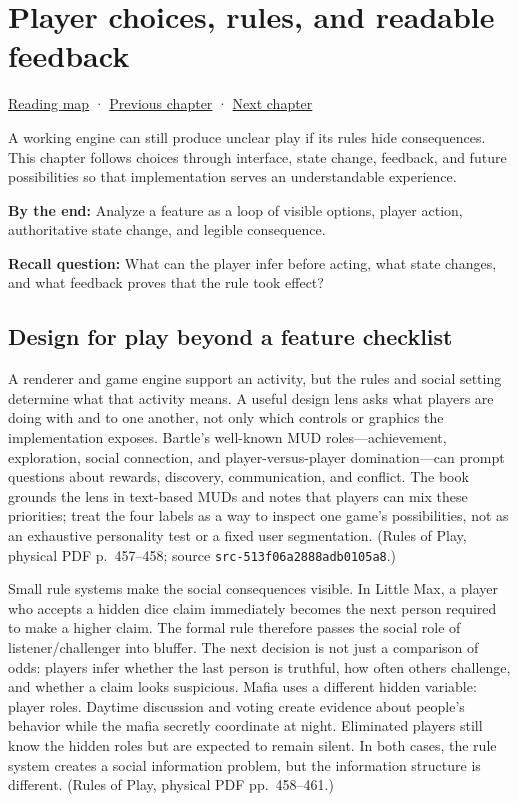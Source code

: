 \hypertarget{05-engine-i-ch009}{}
\chapter{Player choices, rules, and readable feedback}\label{stagechapter:05-engine-i-ch009}\label{05-engine-i-ch009-player-choices-rules-and-readable-feedback}

\hyperref[volume-reading-map]{Reading map} · \hyperref[05-engine-i-ch008-algorithms-application-boundaries-and-a-first-playable]{Previous chapter} · \hyperref[05-engine-i-ch010-engine-changes-across-subsystem-contracts]{Next chapter}

A working engine can still produce unclear play if its rules hide consequences. This chapter follows choices through interface, state change, feedback, and future possibilities so that implementation serves an understandable experience.

\textbf{By the end:} Analyze a feature as a loop of visible options, player action, authoritative state change, and legible consequence.

\textbf{Recall question:} What can the player infer before acting, what state changes, and what feedback proves that the rule took effect?

\section{Design for play beyond a feature checklist}\label{05-engine-i-ch009-design-for-play-beyond-a-feature-checklist}

A renderer and game engine support an activity, but the rules and social setting determine what that activity means. A useful design lens asks what players are doing with and to one another, not only which controls or graphics the implementation exposes. Bartle's well-known MUD roles---achievement, exploration, social connection, and player-versus-player domination---can prompt questions about rewards, discovery, communication, and conflict. The book grounds the lens in text-based MUDs and notes that players can mix these priorities; treat the four labels as a way to inspect one game's possibilities, not as an exhaustive personality test or a fixed user segmentation. (Rules of Play, physical PDF p.~457--458; source \texttt{src-513f06a2888adb0105a8}.)

Small rule systems make the social consequences visible. In Little Max, a player who accepts a hidden dice claim immediately becomes the next person required to make a higher claim. The formal rule therefore passes the social role of listener/challenger into bluffer. The next decision is not just a comparison of odds: players infer whether the last person is truthful, how often others challenge, and whether a claim looks suspicious. Mafia uses a different hidden variable: player roles. Daytime discussion and voting create evidence about people's behavior while the mafia secretly coordinate at night. Eliminated players still know the hidden roles but are expected to remain silent. In both cases, the rule system creates a social information problem, but the information structure is different. (Rules of Play, physical PDF pp.~458--461.)

